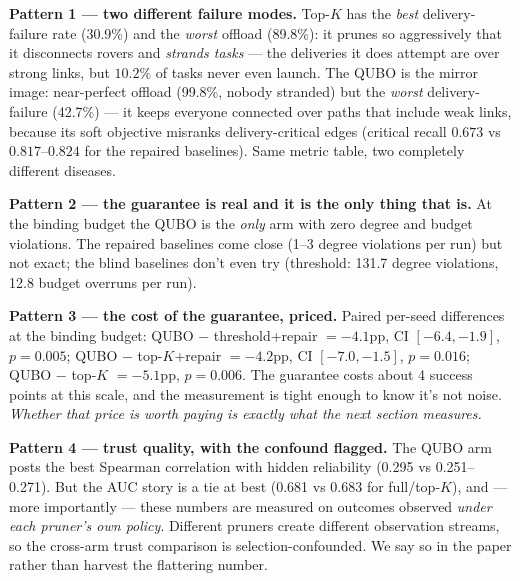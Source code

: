 \documentclass[11pt]{article}
\newenvironment{card}{%
  \def\FrameCommand{\fboxsep=8pt\fcolorbox{cardline}{cardbg}}%
  \MakeFramed{\advance\hsize-\width\FrameRestore}\noindent}{\endMakeFramed}
\begin{document}
\begin{card}
\textbf{Pattern 1 --- two different failure modes.} Top-$K$ has the
\emph{best} delivery-failure rate (30.9\%) and the \emph{worst} offload
(89.8\%): it prunes so aggressively that it disconnects rovers and
\emph{strands tasks} --- the deliveries it does attempt are over strong
links, but $10.2\%$ of tasks never even launch. The QUBO is the mirror
image: near-perfect offload (99.8\%, nobody stranded) but the \emph{worst}
delivery-failure (42.7\%) --- it keeps everyone connected over paths that
include weak links, because its soft objective misranks delivery-critical
edges (critical recall $0.673$ vs $0.817$--$0.824$ for the repaired
baselines). Same metric table, two completely different diseases.
\end{card}

\begin{card}
\textbf{Pattern 2 --- the guarantee is real and it is the only thing that
is.} At the binding budget the QUBO is the \emph{only} arm with zero
degree and budget violations. The repaired baselines come close (1--3
degree violations per run) but not exact; the blind baselines don't even
try (threshold: 131.7 degree violations, 12.8 budget overruns per run).
\end{card}

\begin{card}
\textbf{Pattern 3 --- the cost of the guarantee, priced.} Paired per-seed
differences at the binding budget: QUBO $-$ threshold+repair $=
-4.1$pp, CI $[-6.4, -1.9]$, $p=0.005$; QUBO $-$ top-$K$+repair $= -4.2$pp,
CI $[-7.0, -1.5]$, $p=0.016$; QUBO $-$ top-$K$ $= -5.1$pp, $p=0.006$. The
guarantee costs about 4 success points at this scale, and the measurement
is tight enough to know it's not noise. \emph{Whether that price is worth
paying is exactly what the next section measures.}
\end{card}

\begin{card}
\textbf{Pattern 4 --- trust quality, with the confound flagged.} The QUBO
arm posts the best Spearman correlation with hidden reliability (0.295 vs
0.251--0.271). But the AUC story is a tie at best (0.681 vs 0.683 for
full/top-$K$), and --- more importantly --- these numbers are measured on
outcomes observed \emph{under each pruner's own policy}. Different pruners
create different observation streams, so the cross-arm trust comparison is
selection-confounded. We say so in the paper rather than harvest the
flattering number.
\end{card}
\end{document}
